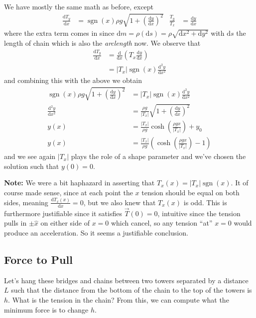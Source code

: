 \documentclass[12pt]{report}
\newcommand{\rd}[2]{\frac{\mathrm{d}#1}{\mathrm{d}#2}}
\newcommand{\rtd}[2]{\frac{\mathrm{d}^2#1}{\mathrm{d}#2^2}}
\newcommand{\abs}[1]{\left|#1\right|}
\DeclareMathOperator{\sgn}{sgn}
\begin{document}
We have mostly the same math as before, except
\begin{align*}
    \rd{T_y}{x} &= \sgn(x) \rho g \sqrt{1 + \left( \rd{y}{x} \right)^2} &
    \frac{T_y}{T_x} &= \rd{y}{x}
\end{align*}
where the extra term comes in since $\mathrm{d}m = \rho (\mathrm{d}s) = \rho
\sqrt{\mathrm{d}x^2 + \mathrm{d}y^2}$ with $\mathrm{d}s$ the length of chain
which is also the \emph{arclength} now. We observe that
\begin{align*}
    \rd{T_y}{x} &= \rd{}{x}\left( T_x\rd{y}{x} \right) \\
    &= \abs{T_x}\sgn(x) \rtd{y}{x}
\end{align*}
and combining this with the above we obtain
\begin{align}
    \sgn(x) \rho g \sqrt{1 + \left( \rd{y}{x} \right)^2}
        &= \abs{T_x}\sgn(x)\rtd{y}{x}\nonumber\\
    \rtd{y}{x} &= \frac{\rho g}{\abs{T_x}}
        \sqrt{1 + \left( \rd{y}{x} \right)^2}\nonumber\\
    y(x) &= \frac{\abs{T_x}}{\rho g} \cosh
        \left( \frac{\rho g x}{\abs{T_x}} \right) + y_0\nonumber\\
    y(x) &= \frac{\abs{T_x}}{\rho g} \left(
        \cosh\left( \frac{\rho g x}{\abs{T_x}} \right)
        - 1\right) \label{eq:chain_curve}
\end{align}
and we see again $\abs{T_x}$ plays the role of a shape parameter and we've
chosen the solution such that $y(0) = 0$.

\textbf{Note:} We were a bit haphazard in asserting that $T_x(x) =
\abs{T_x}\sgn(x)$. It of course made sense, since at each point the $x$ tension
should be equal on both sides, meaning $\rd{T_x(x)}{x} = 0$, but we also knew
that $T_x(x)$ is odd. This is furthermore justifiable since it satisfies
$\vec{T}(0) = 0$, intuitive since the tension pulls in $\pm \hat{x}$ on either
side of $x=0$ which cancel, so any tension ``at'' $x = 0$ would produce an
acceleration. So it seems a justifiable conclusion.

\subsection{Force to Pull}

Let's hang these bridges and chains between two towers separated by a distance
$L$ such that the distance from the bottom of the chain to the top of the towers
is $h$. What is the tension in the chain? From this, we can compute what the
minimum force is to change $h$.
\end{document}
